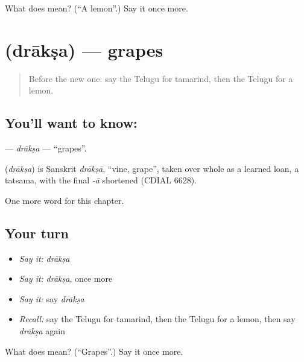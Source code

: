 \begin{tcolorbox}[breakable,colback=teal!4,colframe=teal!35!black,title={Before you move on}]
What does  mean? (\textquotedblleft{}A lemon\textquotedblright{}.) Say it once more.
\end{tcolorbox}
\section[\texorpdfstring{\te{ద్రాక్ష} (drākṣa)}{ద్రాక్ష (drākṣa)}]{ (drākṣa) — grapes}

\label{lesson:TE-C135-draksa}



\begin{quote}
Before the new one: say the Telugu for tamarind, then the Telugu for a lemon.
\end{quote}

\subsection*{You'll want to know: }
\textbf{} — \emph{drākṣa} — \textquotedblleft{}grapes\textquotedblright{}.

\begin{cousinweb}
\textbf{} (\emph{drākṣa}) is Sanskrit \emph{drākṣā}, \textquotedblleft{}vine, grape\textquotedblright{}, taken over whole as a learned loan, a tatsama, with the final \emph{-ā} shortened (CDIAL 6628).
\end{cousinweb}

\begin{grammarlens}[title={What you've built}]
One more word for this chapter.
\end{grammarlens}

\subsection*{Your turn}
\begin{itemize}
\raggedright
  \item \emph{Say it:} \emph{drākṣa}
  \item \emph{Say it:} \emph{drākṣa}, once more
  \item \emph{Say it:} say \emph{drākṣa}
  \item \emph{Recall:} say the Telugu for tamarind, then the Telugu for a lemon, then say \emph{drākṣa} again
\end{itemize}

\begin{tcolorbox}[breakable,colback=teal!4,colframe=teal!35!black,title={Before you move on}]
What does  mean? (\textquotedblleft{}Grapes\textquotedblright{}.) Say it once more.
\end{tcolorbox}
